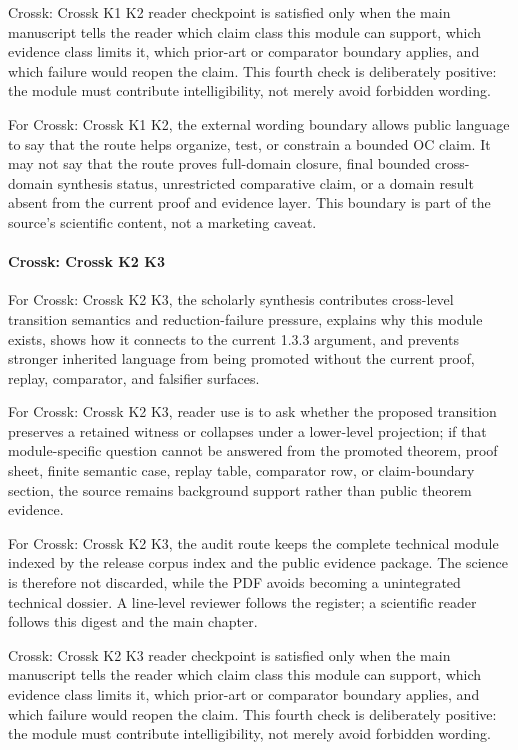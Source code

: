 Crossk: Crossk K1 K2 reader checkpoint is satisfied only when the main manuscript tells the reader which claim class this module can support, which evidence class limits it, which prior-art or comparator boundary applies, and which failure would reopen the claim. This fourth check is deliberately positive: the module must contribute intelligibility, not merely avoid forbidden wording.


For Crossk: Crossk K1 K2, the external wording boundary allows public language to say that the route helps organize, test, or constrain a bounded OC claim. It may not say that the route proves full-domain closure, final bounded cross-domain synthesis status, unrestricted comparative claim, or a domain result absent from the current proof and evidence layer. This boundary is part of the source's scientific content, not a marketing caveat.


\paragraph{Crossk: Crossk K2 K3}

For Crossk: Crossk K2 K3, the scholarly synthesis contributes cross-level transition semantics and reduction-failure pressure, explains why this module exists, shows how it connects to the current 1.3.3 argument, and prevents stronger inherited language from being promoted without the current proof, replay, comparator, and falsifier surfaces.


For Crossk: Crossk K2 K3, reader use is to ask whether the proposed transition preserves a retained witness or collapses under a lower-level projection; if that module-specific question cannot be answered from the promoted theorem, proof sheet, finite semantic case, replay table, comparator row, or claim-boundary section, the source remains background support rather than public theorem evidence.


For Crossk: Crossk K2 K3, the audit route keeps the complete technical module indexed by the release corpus index and the public evidence package. The science is therefore not discarded, while the PDF avoids becoming a unintegrated technical dossier. A line-level reviewer follows the register; a scientific reader follows this digest and the main chapter.


Crossk: Crossk K2 K3 reader checkpoint is satisfied only when the main manuscript tells the reader which claim class this module can support, which evidence class limits it, which prior-art or comparator boundary applies, and which failure would reopen the claim. This fourth check is deliberately positive: the module must contribute intelligibility, not merely avoid forbidden wording.


